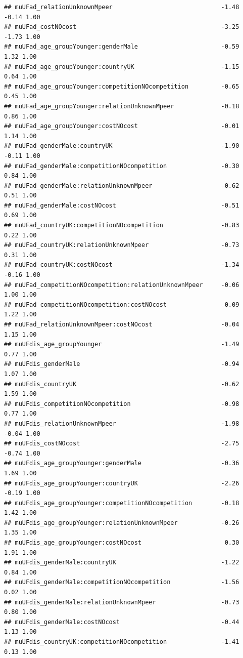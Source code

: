 \documentclass[
]{article}
\begin{document}
\begin{verbatim}
## muUFad_relationUnknownMpeer                              -1.48    -0.14 1.00
## muUFad_costNOcost                                        -3.25    -1.73 1.00
## muUFad_age_groupYounger:genderMale                       -0.59     1.32 1.00
## muUFad_age_groupYounger:countryUK                        -1.15     0.64 1.00
## muUFad_age_groupYounger:competitionNOcompetition         -0.65     0.45 1.00
## muUFad_age_groupYounger:relationUnknownMpeer             -0.18     0.86 1.00
## muUFad_age_groupYounger:costNOcost                       -0.01     1.14 1.00
## muUFad_genderMale:countryUK                              -1.90    -0.11 1.00
## muUFad_genderMale:competitionNOcompetition               -0.30     0.84 1.00
## muUFad_genderMale:relationUnknownMpeer                   -0.62     0.51 1.00
## muUFad_genderMale:costNOcost                             -0.51     0.69 1.00
## muUFad_countryUK:competitionNOcompetition                -0.83     0.22 1.00
## muUFad_countryUK:relationUnknownMpeer                    -0.73     0.31 1.00
## muUFad_countryUK:costNOcost                              -1.34    -0.16 1.00
## muUFad_competitionNOcompetition:relationUnknownMpeer     -0.06     1.00 1.00
## muUFad_competitionNOcompetition:costNOcost                0.09     1.22 1.00
## muUFad_relationUnknownMpeer:costNOcost                   -0.04     1.15 1.00
## muUFdis_age_groupYounger                                 -1.49     0.77 1.00
## muUFdis_genderMale                                       -0.94     1.07 1.00
## muUFdis_countryUK                                        -0.62     1.59 1.00
## muUFdis_competitionNOcompetition                         -0.98     0.77 1.00
## muUFdis_relationUnknownMpeer                             -1.98    -0.04 1.00
## muUFdis_costNOcost                                       -2.75    -0.74 1.00
## muUFdis_age_groupYounger:genderMale                      -0.36     1.69 1.00
## muUFdis_age_groupYounger:countryUK                       -2.26    -0.19 1.00
## muUFdis_age_groupYounger:competitionNOcompetition        -0.18     1.42 1.00
## muUFdis_age_groupYounger:relationUnknownMpeer            -0.26     1.35 1.00
## muUFdis_age_groupYounger:costNOcost                       0.30     1.91 1.00
## muUFdis_genderMale:countryUK                             -1.22     0.84 1.00
## muUFdis_genderMale:competitionNOcompetition              -1.56     0.02 1.00
## muUFdis_genderMale:relationUnknownMpeer                  -0.73     0.80 1.00
## muUFdis_genderMale:costNOcost                            -0.44     1.13 1.00
## muUFdis_countryUK:competitionNOcompetition               -1.41     0.13 1.00

\end{verbatim}
\end{document}
